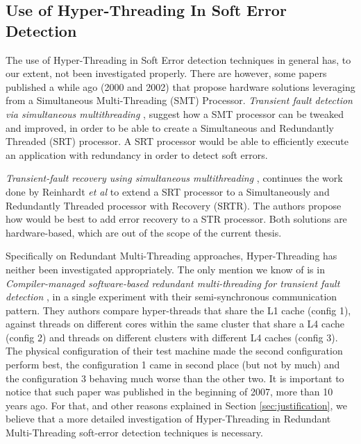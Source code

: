 \subsection{Use of Hyper-Threading In Soft Error Detection}
\label{subsec:useOfHyperThreading}
The use of Hyper-Threading in Soft Error detection techniques in general has, to our extent, not been investigated properly. There are however, some papers published a while ago (2000 and 2002) that propose hardware solutions leveraging from a Simultaneous Multi-Threading (SMT) Processor. \textit{Transient fault detection via simultaneous multithreading} \cite{reinhardt2000detectionSimultaneousMultithreading}, suggest how a SMT processor can be tweaked and improved, in order to be able to create a Simultaneous and Redundantly Threaded (SRT) processor.  A SRT processor would be able to efficiently execute an application with redundancy in order to detect soft errors.

\textit{Transient-fault recovery using simultaneous multithreading} \cite{vijaykumar2002recoverySimultaneousMultithreading}, continues the work done by Reinhardt \textit{et al} \cite{reinhardt2000detectionSimultaneousMultithreading} to extend a SRT processor to a Simultaneously and Redundantly Threaded processor with Recovery (SRTR). The authors propose how would be best to add error recovery to a STR processor. Both solutions are hardware-based, which are out of the scope of the current thesis. 


Specifically on Redundant Multi-Threading approaches, Hyper-Threading has neither been investigated appropriately. The only mention we know of is in \textit{Compiler-managed software-based redundant multi-threading for transient fault detection} \cite{wang2007compiler}, in a single experiment with their semi-synchronous communication pattern. They authors compare hyper-threads that share the L1 cache (config 1), against threads on different cores within the same cluster that share a L4 cache (config 2) and threads on different clusters with different L4 caches (config 3). The physical configuration of their test machine made the second configuration perform best, the configuration 1 came in second place (but not by much) and the configuration 3 behaving much worse than the other two. It is important to notice that such paper was published in the beginning of 2007, more than 10 years ago. For that, and other reasons explained in Section \ref{sec:justification}, we believe that a more detailed investigation of Hyper-Threading in Redundant Multi-Threading soft-error detection techniques is necessary. 
